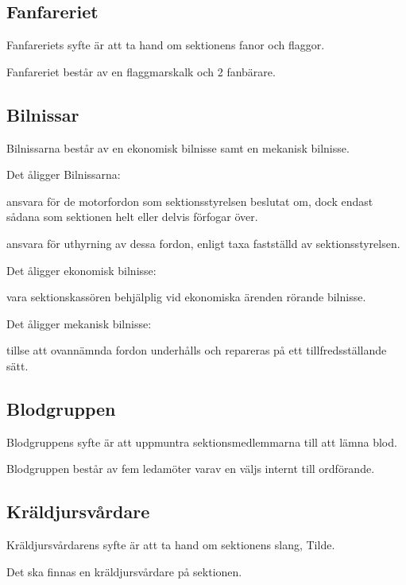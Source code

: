 \documentclass{styrdokument}
\begin{document}
\subsection{Fanfareriet}
\? Fanfareriets syfte är att ta hand om sektionens fanor och flaggor.

\? Fanfareriet består av en flaggmarskalk och 2 fanbärare.

\subsection{Bilnissar}
\? Bilnissarna består av en ekonomisk bilnisse samt en mekanisk bilnisse.

\? Det åligger Bilnissarna:
\begin{aligganden}
    \item ansvara för de motorfordon som sektionsstyrelsen beslutat om, dock endast sådana som sektionen helt eller delvis förfogar över.
    \item ansvara för uthyrning av dessa fordon, enligt taxa fastställd av sektionsstyrelsen.
\end{aligganden}

\? Det åligger ekonomisk bilnisse:
\begin{aligganden}
    \item vara sektionskassören behjälplig vid ekonomiska ärenden rörande bilnisse.
\end{aligganden}

\? Det åligger mekanisk bilnisse:
\begin{aligganden}
    \item tillse att ovannämnda fordon underhålls och repareras på ett tillfredsställande sätt.
\end{aligganden}

\subsection{Blodgruppen}
\? Blodgruppens syfte är att uppmuntra sektionsmedlemmarna till att lämna blod.

\? Blodgruppen består av fem ledamöter varav en väljs internt till ordförande.

\subsection{Kräldjursvårdare}
\? Kräldjursvårdarens syfte är att ta hand om sektionens slang, Tilde.

\? Det ska finnas en kräldjursvårdare på sektionen.
\end{document}
